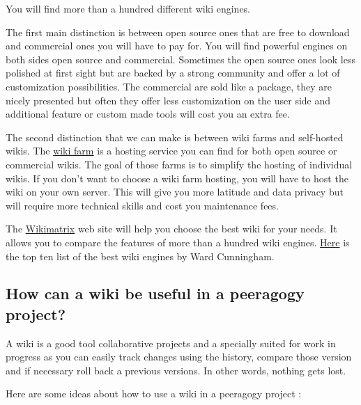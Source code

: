 You will find more than a hundred different wiki engines. 

The first main
distinction is between open source ones that are free to download and
commercial ones you will have to pay for. You will find powerful engines
on both sides open source and commercial. Sometimes the open source ones
look less polished at first sight but are backed by a strong community
and offer a lot of customization possibilities. The commercial are sold
like a package, they are nicely presented but often they offer less
customization on the user side and additional feature or custom made
tools will cost you an extra fee. 

The second distinction that we can
make is between wiki farms and self-hosted wikis. The
\href{http://en.wikipedia.org/wiki/Wiki\_hosting\_service}{wiki farm} is
a hosting service you can find for both open source or commercial wikis.
The goal of those farms is to simplify the hosting of individual wikis.
If you don't want to choose a wiki farm hosting, you will have to host
the wiki on your own server. This will give you more latitude and data
privacy but will require more technical skills and cost you maintenance
fees.

The \href{http://www.wikimatrix.org/}{Wikimatrix} web site will help you
choose the best wiki for your needs. It allows you to compare the
features of more than a hundred wiki engines.
\href{http://c2.com/cgi/wiki?TopTenWikiEngines}{Here} is the top ten
list of the best wiki engines by Ward Cunningham.

\subsection{How can a wiki be useful in a peeragogy project?}

A wiki is a good tool collaborative projects and a specially suited for
work in progress as you can easily track changes using the history,
compare those version and if necessary roll back a previous versions. In
other words, nothing gets lost.

Here are some ideas about how to use a wiki in a peeragogy project :

